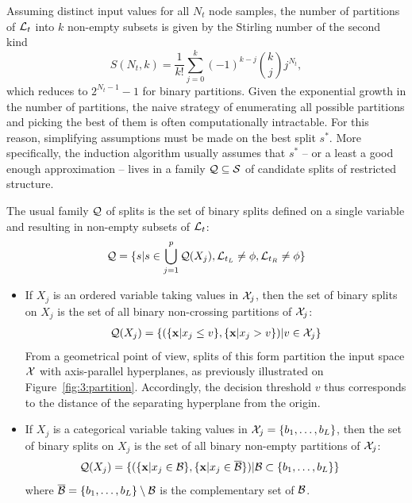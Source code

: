 Assuming distinct input values for all $N_t$ node samples, the number of partitions of ${\cal L}_t$ into $k$
non-empty subsets is given by the Stirling number of the second
kind~\citep{knuth:1992}
\begin{equation}
S(N_t, k) = \frac{1}{k!} \sum_{j=0}^k (-1)^{k-j} {k\choose j} j^{N_t},
\end{equation}
which reduces to $2^{N_t-1}-1$ for binary partitions. Given the exponential
growth in the number of partitions, the naive strategy of enumerating all
possible partitions and picking the best of them is often computationally
intractable. For this reason, simplifying  assumptions must be made on the best
split $s^*$. More specifically, the induction algorithm usually assumes that
$s^*$ -- or a least a good enough approximation -- lives in a family ${\cal Q}
\subseteq {\cal S}$ of candidate splits of restricted structure.

The usual family ${\cal Q}$ of
splits is the set of binary splits defined on a single variable and resulting
in non-empty subsets of ${\cal L}_t$:
\begin{equation}\label{eqn:q:single-variables}
{\cal Q} = \{s | s \in \bigcup_{j=1}^p {\cal Q}(X_j), {\cal L}_{t_L} \neq \phi, {\cal L}_{t_R} \neq \phi \}
\end{equation}
\begin{itemize}
\item If $X_j$ is an ordered variable taking values in ${\cal X}_j$, then the set of binary splits on $X_j$ is the set
of all binary non-crossing partitions of ${\cal X}_j$:
\begin{align}
{\cal Q}(X_j) = \{ (\{ \mathbf{x} | x_j \leq v \}, \{ \mathbf{x} | x_j > v \}) | v \in {\cal X}_j \} \label{eqn:q:ordered}
\end{align}
From a geometrical point of view, splits of this form partition the input space
${\cal X}$ with axis-parallel hyperplanes, as previously illustrated on
Figure~\ref{fig:3:partition}. Accordingly, the decision threshold $v$ thus
corresponds to the distance of the separating hyperplane from the origin.
\item If $X_j$ is a categorical variable taking values in ${\cal X}_j = \{ b_1, \dots, b_L \}$, then the set of binary splits on
$X_j$ is the set of all binary  non-empty partitions of ${\cal X}_j$:
\begin{align}\label{eqn:q:categorical-cart}
{\cal Q}(X_j) = \{ (\{\mathbf{x} | x_j \in {\cal B} \}, \{\mathbf{x} | x_j \in \overline{\cal B}\}) | &{\cal B} \subset \{ b_1, \dots, b_L \} \}
\end{align}
where $\overline{\cal B} = \{ b_1, \dots, b_L \} \setminus {\cal B}$ is the complementary set of ${\cal B}$.
\end{itemize}

